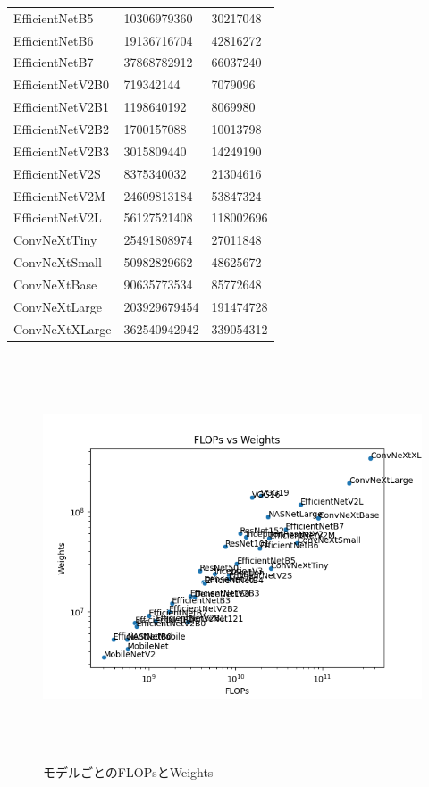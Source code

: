 \begin{table}[H]
\begin{tabular}{lll}
		EfficientNetB5 & 10306979360 & 30217048 \\ 
		EfficientNetB6 & 19136716704 & 42816272 \\ 
		EfficientNetB7 & 37868782912 & 66037240 \\ 
		EfficientNetV2B0 & 719342144 & 7079096 \\ 
		EfficientNetV2B1 & 1198640192 & 8069980 \\ 
		EfficientNetV2B2 & 1700157088 & 10013798 \\ 
		EfficientNetV2B3 & 3015809440 & 14249190 \\ 
		EfficientNetV2S & 8375340032 & 21304616 \\ 
		EfficientNetV2M & 24609813184 & 53847324 \\ 
		EfficientNetV2L & 56127521408 & 118002696 \\ 
		ConvNeXtTiny & 25491808974 & 27011848 \\ 
		ConvNeXtSmall & 50982829662 & 48625672 \\ 
		ConvNeXtBase & 90635773534 & 85772648 \\ 
		ConvNeXtLarge & 203929679454 & 191474728 \\ 
		ConvNeXtXLarge & 362540942942 & 339054312 \\ 
		\hline
	\end{tabular}
\end{table}

\begin{figure} [H]
	\begin{center}
		\includegraphics[clip, height=12cm, bb=-60 0 640 480]{data/figure/models_info.png}
		\caption{モデルごとのFLOPsとWeights}
		\label{flops_vs_weights}
	\end{center}
\end{figure}

